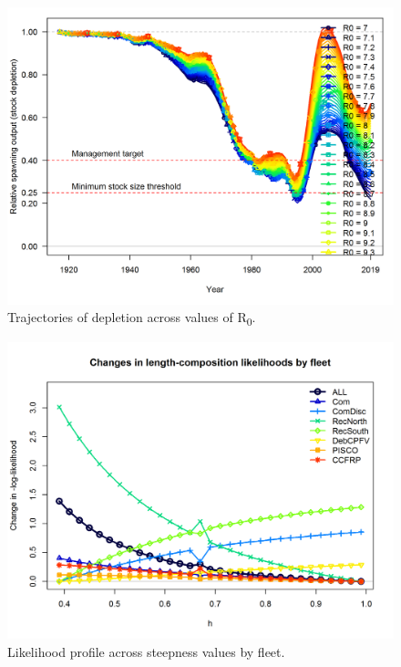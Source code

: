 \documentclass[12pt,]{article}
\begin{document}
\begin{figure}
\centering
\includegraphics{Figures/profile_R0_depl.png}
\caption{Trajectories of depletion across values of R\textsubscript{0}.
\label{fig:profile_R0_depl}}
\end{figure}

\FloatBarrier

\begin{figure}
\centering
\includegraphics{Figures/profile_h_piner.png}
\caption{Likelihood profile across steepness values by fleet.
\label{fig:profile_h_piner}}
\end{figure}
\end{document}
